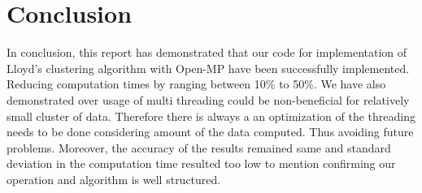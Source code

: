 \documentclass{article}
\begin{document}
 


 \section{Conclusion}
In conclusion, this report has demonstrated that our code for implementation of Lloyd's clustering algorithm with Open-MP have been successfully implemented. Reducing computation times by ranging between 10\% to 50\%. We have also demonstrated over usage of multi threading could be non-beneficial for relatively small cluster of data. Therefore there is always a an optimization of the threading needs to be done considering amount of the data computed. Thus avoiding future problems. Moreover, the accuracy of the results remained same and standard deviation in the computation time resulted too low to mention confirming our operation and algorithm is well structured.
\end{document}
